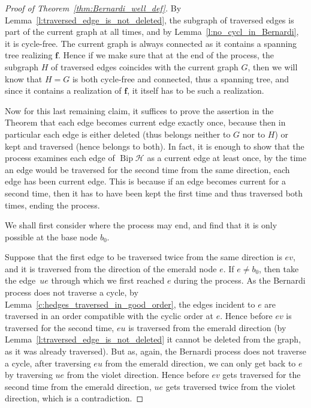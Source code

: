 \documentclass[ALCO,ThmDefs,Unicode,epreuves]{cedram}
\newcommand{\HH}{\mathcal H}
\DeclareMathOperator{\bip}{Bip}
\begin{document}
\begin{proof}[Proof of Theorem~\ref{thm:Bernardi_well_def}]
By Lemma~\ref{l:traversed_edge_is_not_deleted}, the subgraph of traversed edges is part of the current graph at all times, and by Lemma~\ref{l:no_cycl_in_Bernardi}, it is cycle-free. The current graph is always connected as it contains a spanning tree realizing $\mathbf f$. Hence if we make sure that at the end of the process, the subgraph $H$ of traversed edges coincides with the current graph $G$, then we will know that $H=G$ is both cycle-free and connected, thus a spanning tree, and since it contains a realization of $\mathbf f$, it itself has to be such a realization. 

Now for this last remaining claim, it suffices to prove the assertion in the Theorem that each edge becomes current edge exactly once, because then in particular each edge is either deleted (thus belongs neither to $G$ nor to $H$) or kept and traversed (hence belongs to both). In fact, it is enough to show that the process examines each edge of $\bip \HH$ as a current edge at least once, \ie by the time an edge would be traversed for the second time from the same direction, each edge has been current edge. This is because if an edge becomes current for a second time, then it has to have been kept the first time and thus traversed both times, ending the process.

We shall first consider where the process may end, and find that it is only possible at the base node $b_0$.

Suppose that the first edge to be traversed twice from the same direction is $ev$, and it is traversed from the direction of the emerald node $e$. If $e\neq b_0$, then take the edge~$ue$ through which we first reached $e$ during the process. As the Bernardi process does not traverse a cycle, by Lemma~\ref{c:hedges_traversed_in_good_order}, the edges incident to $e$ are traversed in an order compatible with the cyclic order at $e$. Hence before $ev$ is traversed for the second time, $eu$ is traversed from the emerald direction (by Lemma~\ref{l:traversed_edge_is_not_deleted} it cannot be deleted from the graph, as it was already traversed). But as, again, the Bernardi process does not traverse a cycle, after traversing $eu$ from the emerald direction, we can only get back to $e$ by traversing $ue$ from the violet direction. Hence before $ev$ gets traversed for the second time from the emerald direction, $ue$ gets traversed twice from the violet direction, which is a contradiction.


\end{proof}
\end{document}
